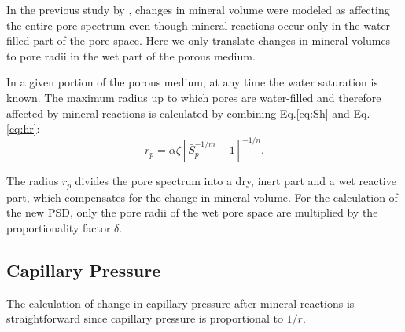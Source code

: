 \documentclass[preprint,12pt,authoryear]{elsarticle}
\begin{document}
In the previous study by \citet{verma1988thermohydrological}, changes in mineral volume were modeled as affecting the entire pore spectrum even though mineral reactions occur only in the water-filled part of the pore space. Here we only translate changes in mineral volumes to pore radii in the wet part of the porous medium. 

In a given portion of the porous medium, at any time the water saturation is known. The maximum radius up to which pores are water-filled and therefore affected by mineral reactions is calculated by combining Eq.\ref{eq:Sh} and Eq.\ref{eq:hr}:
\begin{equation}
\label{eq:rthreshold}
r_{p}=\alpha \zeta [\bar{S}_p^{-1/m}-1]^{-1/n}.
\end{equation}

The radius $r_{p}$ divides the pore spectrum into a dry, inert part and a wet reactive part, which compensates for the change in mineral volume. For the calculation of the new PSD, only the pore radii of the wet pore space are multiplied by the proportionality factor $\delta$.

\subsection{Capillary Pressure}
The calculation of change in capillary pressure after mineral reactions is straightforward since capillary pressure is proportional to $1/r$. 
%
\end{document}
